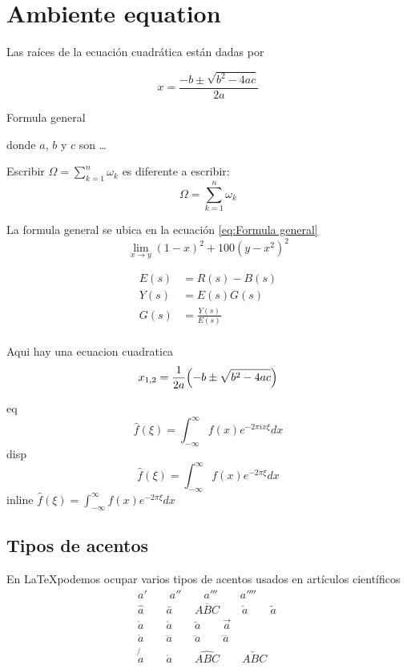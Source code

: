 \documentclass{report}
\newcommand{\Fourier}[1][eq] {
	\IfEqCase {#1} {	%
		{eq} {
			\begin{equation}
			\hat{f}(\xi)=\int_{-\infty}^{\infty}f(x)e^{-2\pi ix \xi}dx
			\end{equation}
		}
		{disp} {
			\[
			\hat{f}(\xi)=\int_{-\infty}^{\infty}f(x)e^{-2\pi\xi}dx
			\]
		}
		{inline} {	%
			$\hat{f}(\xi)=\int_{-\infty}^{\infty}f(x)e^{-2\pi\xi}dx$}
	}
}
\begin{document}
\section{Ambiente equation}
Las raíces de la ecuación cuadrática están dadas por
\begin{Ecuacion}

\begin{equation}
x=\frac{-b\pm \sqrt{b^2-4ac}}{2a}
\label{eq:Formula general}
\end{equation}
\caption{Formula general}
\end{Ecuacion}
donde $a$, $b$ y $c$ son \ldots

Escribir $\Omega=\sum_{k=1}^n \omega_k$ es diferente a escribir: 
\begin{equation*}
\Omega=\sum_{k=1}^n\omega_k
\end{equation*}

La formula general se ubica en la ecuación \cref{eq:Formula general}
\begin{equation}
\lim_{x\rightarrow y}{(1-x)^2+100(y-x^2)^2}
\end{equation}

\begin{align*}
E(s)&=R(s)-B(s)\\
Y(s)&=E(s)G(s)\\
G(s)&=\frac{Y(s)}{E(s)}\\
\end{align*}
\newcommand{\cuadratica} {
	\begin{equation}
	x_{1,2}=\frac{1}{2a}\Bigl(-b\pm \sqrt{b^2-4ac}\Bigr)
	\end{equation}
}


Aqui hay una ecuacion cuadratica \cuadratica


\lipsum[1]
\Fourier[disp]\\
\lipsum[1]

\subsection{Tipos de acentos}

En \LaTeX podemos ocupar varios tipos de acentos usados en artículos científicos\\
\begin{gather}
a'\qquad a''\qquad a'''\qquad a''''\qquad\\
\hat{a}\qquad\bar{a}\qquad\overline{ABC}\qquad\check{a}\qquad\tilde{a}\\
\grave{a}\qquad\acute{a}\qquad\breve{a}\qquad\vec{a}\\
\dot{a}\qquad\ddot{a}\qquad\dddot{a}\qquad\ddddot{a}\\
\not{a}\qquad\mathring{a}\qquad\widehat{ABC}\qquad\widetilde{ABC}
\end{gather}
\end{document}
